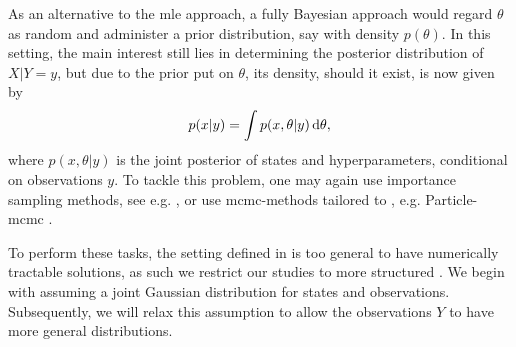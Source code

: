 As an alternative to the \acrshort{mle} approach, a fully Bayesian approach would regard $\theta$ as random and administer a prior distribution, say with density $p(\theta)$. In this setting, the main interest still lies in determining the posterior distribution of $X|Y=y$, but due to the prior put on $\theta$, its density, should it exist, is now given by
$$
p(x|y) = \int p(x,\theta|y) \,\mathrm d \theta,
$$
where $p(x,\theta|y)$ is the joint posterior of states and hyperparameters, conditional on observations $y$. To tackle this problem, one may again use importance sampling methods, see e.g. \citep[Chapter 13.1]{Durbin2012Time}, or use \acrshort{mcmc}-methods tailored to , e.g. Particle-\acrshort{mcmc} \citep[Chapter 16]{Chopin2020Introduction}.

To perform these tasks, the setting defined in  is too general to have numerically tractable solutions, as such we restrict our studies to more structured . We begin with assuming a joint Gaussian distribution for states and observations. Subsequently, we will relax this assumption to allow the observations $Y$ to have more general distributions. 
%





%



